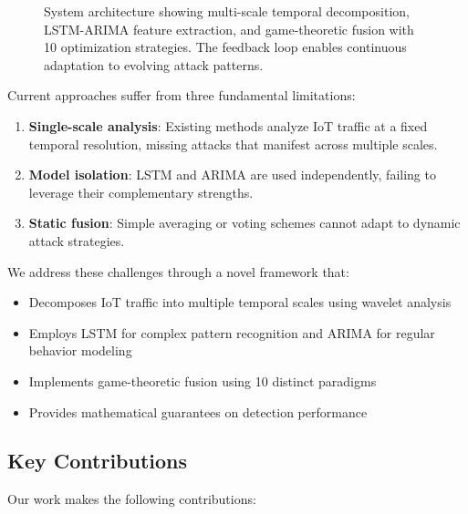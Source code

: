 \documentclass[10pt,conference]{IEEEtran}
\begin{document}
\begin{figure}[!t]
\caption{System architecture showing multi-scale temporal decomposition, LSTM-ARIMA feature extraction, and game-theoretic fusion with 10 optimization strategies. The feedback loop enables continuous adaptation to evolving attack patterns.}
\label{fig:architecture}
\end{figure}

Current approaches suffer from three fundamental limitations:
\begin{enumerate}
    \item \textbf{Single-scale analysis}: Existing methods analyze IoT traffic at a fixed temporal resolution, missing attacks that manifest across multiple scales.
    \item \textbf{Model isolation}: LSTM and ARIMA are used independently, failing to leverage their complementary strengths.
    \item \textbf{Static fusion}: Simple averaging or voting schemes cannot adapt to dynamic attack strategies.
\end{enumerate}

We address these challenges through a novel framework that:
\begin{itemize}
    \item Decomposes IoT traffic into multiple temporal scales using wavelet analysis
    \item Employs LSTM for complex pattern recognition and ARIMA for regular behavior modeling
    \item Implements game-theoretic fusion using 10 distinct paradigms
    \item Provides mathematical guarantees on detection performance
\end{itemize}

\subsection{Key Contributions}

Our work makes the following contributions:
\end{document}
